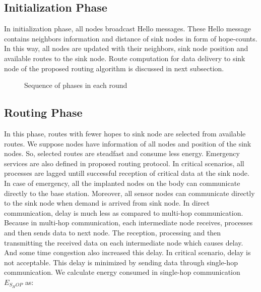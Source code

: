 \documentclass[journal]{IEEEtran}
\begin{document}
\subsection{Initialization Phase}
In initialization phase, all nodes broadcast Hello messages. These Hello message contains neighbors information and distance of sink nodes in form of hope-counts. In this way, all nodes are updated with their neighbors, sink node position and available routes to the sink node. Route computation for data delivery to sink node of the proposed routing algorithm is discussed in next subsection.

\begin{figure*}[ht]
  \centering
  \caption{Sequence of phases in each round}\label{fig2}
\end{figure*}


\subsection{Routing Phase}
In this phase, routes with fewer hopes to sink node are selected from available routes. We suppose nodes have information of all nodes and position of the sink nodes. So, selected routes are steadfast and consume less energy. Emergency services are also defined in proposed routing protocol. In critical scenarios, all processes are lagged untill successful reception of critical data at the sink node. In case of emergency, all the implanted nodes on the body can communicate directly to the base station. Moreover, all sensor nodes can communicate directly to the sink node when demand is arrived from sink node. In direct communication, delay is much less as compared to multi-hop communication. Because in multi-hop communication, each intermediate node receives, processes and then sends data to next node. The reception, processing and then transmitting the received data on each intermediate node which causes delay. And some time congestion also increased this delay. In critical scenario, delay is not acceptable. This delay is minimized by sending data through single-hop communication. We calculate energy consumed in single-hop communication $E_{S_HOP}$ as:
\end{document}
